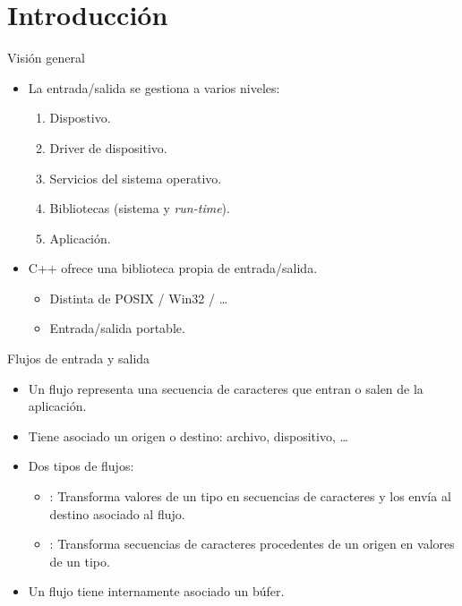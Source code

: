 \section{Introducción}

\begin{frame}{Visión general}
\begin{itemize}
  \item La entrada/salida se gestiona a varios niveles:
    \begin{enumerate}
      \item Dispostivo.
      \item Driver de dispositivo.
      \item Servicios del sistema operativo.
      \item Bibliotecas (sistema y \emph{run-time}).
      \item Aplicación.
    \end{enumerate}
  \item C++ ofrece una biblioteca propia de entrada/salida.
    \begin{itemize}
       \item Distinta de POSIX / Win32 / \ldots
       \item Entrada/salida portable.
    \end{itemize}
\end{itemize}
\end{frame}

\begin{frame}{Flujos de entrada y salida}
\begin{itemize}
  \item Un flujo representa una secuencia de caracteres que entran o salen
        de la aplicación.
  \item Tiene asociado un origen o destino: archivo, dispositivo, \ldots
  \item Dos tipos de flujos:
    \begin{itemize}
      \item {}: Transforma valores de un tipo en secuencias de caracteres y los envía
            al destino asociado al flujo.
      \item {}: Transforma secuencias de caracteres procedentes de un origen
            en valores de un tipo.
    \end{itemize}
  \item Un flujo tiene internamente asociado un búfer.
\end{itemize}
\end{frame}


